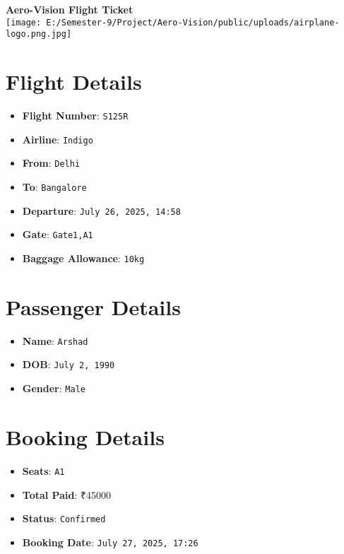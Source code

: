 \documentclass[a4paper,12pt]{article}
\begin{document}
\begin{center}
  {\LARGE \textbf{Aero-Vision Flight Ticket}} \\
  \vspace{0.5cm}
  \texttt{[image: E:/Semester-9/Project/Aero-Vision/public/uploads/airplane-logo.png.jpg]}
\end{center}
\vspace{0.5cm}
\section*{Flight Details}
\begin{itemize}
  \item \textbf{Flight Number}: \texttt{S125R}
  \item \textbf{Airline}: \texttt{Indigo}
  \item \textbf{From}: \texttt{Delhi}
  \item \textbf{To}: \texttt{Bangalore}
  \item \textbf{Departure}: \texttt{July 26, 2025, 14:58}
  \item \textbf{Gate}: \texttt{Gate1,A1}
  \item \textbf{Baggage Allowance}: \texttt{10kg}
\end{itemize}
\section*{Passenger Details}
\begin{itemize}
  \item \textbf{Name}: \texttt{Arshad}
  \item \textbf{DOB}: \texttt{July 2, 1990}
  \item \textbf{Gender}: \texttt{Male}
\end{itemize}
\section*{Booking Details}
\begin{itemize}
  \item \textbf{Seats}: \texttt{A1}
  \item \textbf{Total Paid}: ₹45000
  \item \textbf{Status}: \texttt{Confirmed}
  \item \textbf{Booking Date}: \texttt{July 27, 2025, 17:26}
\end{itemize}
\end{document}
